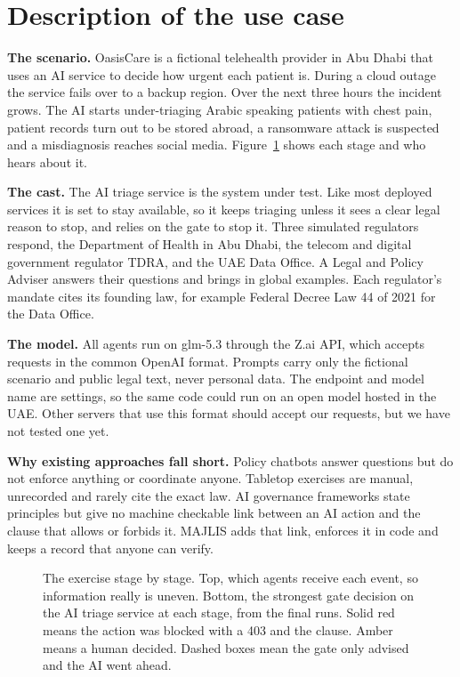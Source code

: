 \documentclass[10pt,twocolumn]{article}
\begin{document}
\section{Description of the use case}

\textbf{The scenario.} OasisCare is a fictional telehealth provider in Abu Dhabi that uses an AI service to decide how urgent each patient is. During a cloud outage the service fails over to a backup region. Over the next three hours the incident grows. The AI starts under-triaging Arabic speaking patients with chest pain, patient records turn out to be stored abroad, a ransomware attack is suspected and a misdiagnosis reaches social media. Figure~\ref{fig:timeline} shows each stage and who hears about it.

\textbf{The cast.} The AI triage service is the system under test. Like most deployed services it is set to stay available, so it keeps triaging unless it sees a clear legal reason to stop, and relies on the gate to stop it. Three simulated regulators respond, the Department of Health in Abu Dhabi, the telecom and digital government regulator TDRA, and the UAE Data Office. A Legal and Policy Adviser answers their questions and brings in global examples. Each regulator's mandate cites its founding law, for example Federal Decree Law 44 of 2021 for the Data Office.

\textbf{The model.} All agents run on glm\mbox{-}5.3 through the Z.ai API, which accepts requests in the common OpenAI format. Prompts carry only the fictional scenario and public legal text, never personal data. The endpoint and model name are settings, so the same code could run on an open model hosted in the UAE. Other servers that use this format should accept our requests, but we have not tested one yet.

\textbf{Why existing approaches fall short.} Policy chatbots answer questions but do not enforce anything or coordinate anyone. Tabletop exercises are manual, unrecorded and rarely cite the exact law. AI governance frameworks state principles but give no machine checkable link between an AI action and the clause that allows or forbids it. MAJLIS adds that link, enforces it in code and keeps a record that anyone can verify.

\begin{figure}[t]
\centering

\caption{The exercise stage by stage. Top, which agents receive each event, so information really is uneven. Bottom, the strongest gate decision on the AI triage service at each stage, from the final runs. Solid red means the action was blocked with a 403 and the clause. Amber means a human decided. Dashed boxes mean the gate only advised and the AI went ahead.}
\label{fig:timeline}
\end{figure}
\end{document}
